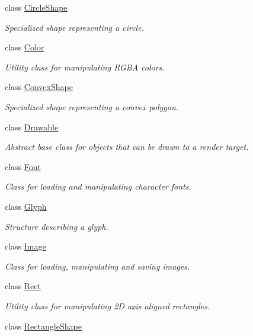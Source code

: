 \begin{DoxyCompactItemize}
class \hyperlink{classsf_1_1_circle_shape}{Circle\-Shape}
\begin{DoxyCompactList}\small\item\em Specialized shape representing a circle. \end{DoxyCompactList}\item 
class \hyperlink{classsf_1_1_color}{Color}
\begin{DoxyCompactList}\small\item\em Utility class for manipulating R\-G\-B\-A colors. \end{DoxyCompactList}\item 
class \hyperlink{classsf_1_1_convex_shape}{Convex\-Shape}
\begin{DoxyCompactList}\small\item\em Specialized shape representing a convex polygon. \end{DoxyCompactList}\item 
class \hyperlink{classsf_1_1_drawable}{Drawable}
\begin{DoxyCompactList}\small\item\em Abstract base class for objects that can be drawn to a render target. \end{DoxyCompactList}\item 
class \hyperlink{classsf_1_1_font}{Font}
\begin{DoxyCompactList}\small\item\em Class for loading and manipulating character fonts. \end{DoxyCompactList}\item 
class \hyperlink{classsf_1_1_glyph}{Glyph}
\begin{DoxyCompactList}\small\item\em Structure describing a glyph. \end{DoxyCompactList}\item 
class \hyperlink{classsf_1_1_image}{Image}
\begin{DoxyCompactList}\small\item\em Class for loading, manipulating and saving images. \end{DoxyCompactList}\item 
class \hyperlink{classsf_1_1_rect}{Rect}
\begin{DoxyCompactList}\small\item\em Utility class for manipulating 2\-D axis aligned rectangles. \end{DoxyCompactList}\item 
class \hyperlink{classsf_1_1_rectangle_shape}{Rectangle\-Shape}

\end{DoxyCompactItemize}
